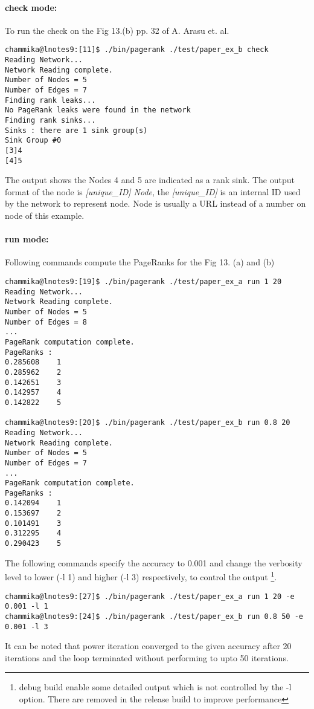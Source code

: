 \documentclass[10pt]{article}
\begin{document}
\paragraph{check mode:} To run the check on the Fig 13.(b) pp. 32 of A. Arasu et. al.

\begin{verbatim}
chammika@lnotes9:[11]$ ./bin/pagerank ./test/paper_ex_b check 
Reading Network...
Network Reading complete.
Number of Nodes = 5
Number of Edges = 7
Finding rank leaks... 
No PageRank leaks were found in the network
Finding rank sinks... 
Sinks : there are 1 sink group(s) 
Sink Group #0
[3]4
[4]5
\end{verbatim}
The output shows the Nodes 4 and 5 are indicated as a rank sink. The output format of the node is 
\emph{[unique\_ID] Node}, the \emph{[unique\_ID]} is an internal ID used by
the network to represent node. Node is usually a URL instead of a number on node of this example.

\paragraph{run mode:} Following commands compute the PageRanks for the Fig 13. (a) and (b)

\begin{verbatim}
chammika@lnotes9:[19]$ ./bin/pagerank ./test/paper_ex_a run 1 20 
Reading Network...
Network Reading complete.
Number of Nodes = 5
Number of Edges = 8
...
PageRank computation complete.
PageRanks :
0.285608	1
0.285962	2
0.142651	3
0.142957	4
0.142822	5

chammika@lnotes9:[20]$ ./bin/pagerank ./test/paper_ex_b run 0.8 20 
Reading Network...
Network Reading complete.
Number of Nodes = 5
Number of Edges = 7
...
PageRank computation complete.
PageRanks :
0.142094	1
0.153697	2
0.101491	3
0.312295	4
0.290423	5
\end{verbatim}

The following commands specify the accuracy to 0.001 and change the verbosity level to lower (-l 1) 
and higher (-l 3) respectively, to control the output
\footnote{debug build enable some detailed output  which is not controlled by the -l option. 
There are removed in the release build to improve performance}.

\begin{verbatim}
chammika@lnotes9:[27]$ ./bin/pagerank ./test/paper_ex_a run 1 20 -e 0.001 -l 1
chammika@lnotes9:[24]$ ./bin/pagerank ./test/paper_ex_b run 0.8 50 -e 0.001 -l 3 
\end{verbatim}
It can be noted that power iteration converged to the given accuracy after 20 iterations and the
loop terminated without performing to upto 50 iterations.
\end{document}

